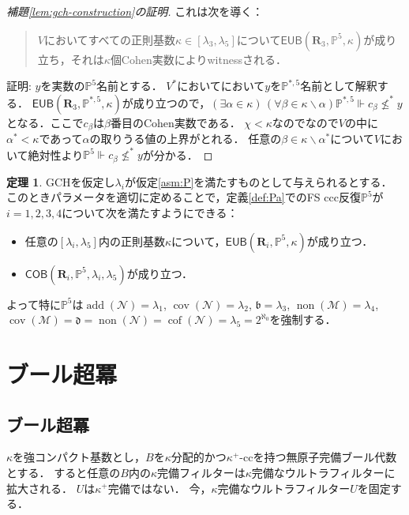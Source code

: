 \documentclass[uplatex,dvipdfmx]{jsarticle}
\newcommand\forces{\Vdash}
\newcommand{\non}{\operatorname{non}}
\newcommand{\cov}{\operatorname{cov}}
\newcommand{\add}{\operatorname{add}}
\newcommand{\cof}{\operatorname{cof}}
\newcommand{\EUB}{\mathsf{EUB}}
\newcommand{\COB}{\mathsf{COB}}
\newcommand{\relR}{\mathbf{R}}
\newcommand{\Pa}{\mathbb{P}^5}
\newcommand{\PaB}{\mathbb{P}^{*,5}}
\newcommand{\covnull}{\cov(\mathcal N)}
\newcommand{\cofnull}{\cof(\mathcal N)}
\newcommand{\addnull}{\add(\mathcal N)}
\newcommand{\nonnull}{\non(\mathcal N)}
\newcommand{\covmeager}{\cov(\mathcal M)}
\newcommand{\nonmeager}{\non(\mathcal M)}
\renewcommand\emptyset{\varnothing}
\renewcommand{\setminus}{\smallsetminus}
\theoremstyle{definition}
\newtheorem{thm}{定理}
\begin{document}
\begin{proof}[補題\ref{lem:gch-construction}の証明]
		これは次を導く：
		\begin{quote}
			$V$においてすべての正則基数$\kappa\in[\lambda_3,\lambda_5]$について$\EUB(\relR_3, \Pa,\kappa)$が成り立ち，それは$\kappa$個Cohen実数によりwitnessされる．
		\end{quote}
	
		証明:
		$y$を実数の$\Pa$名前とする．
		$V^*$においてにおいて$y$を$\PaB$名前として解釈する．
		$\EUB(\relR_3, \PaB,\kappa)$が成り立つので，$(\exists \alpha\in\kappa)\, (\forall \beta\in\kappa\setminus \alpha)
		\PaB\forces  c_\beta \nleq^* y$となる．ここで$c_\beta$は$\beta$番目のCohen実数である．
		$\chi<\kappa$なのでなので$V$の中に$\alpha^*<\kappa$であって$\alpha$の取りうる値の上界がとれる．
		任意の$\beta\in\kappa\setminus \alpha^*$について$V$において絶対性より$\Pa\forces  c_\beta \nleq^* y$が分かる．
	\end{proof}
		
	
	\begin{thm}\label{thm:Pa}
		GCHを仮定し$\lambda_i$が仮定\ref{asm:P}を満たすものとして与えられるとする．
		このときパラメータを適切に定めることで，定義\ref{def:Pa}でのFS ccc反復$\Pa$が$i=1,2,3,4$について次を満たすようにできる：
		\begin{itemize} 
			\item  任意の$[\lambda_i,\lambda_5]$内の正則基数$\kappa$について，$\EUB(\relR_i, \Pa,\kappa)$が成り立つ．
			\item $\COB(\relR_i, \Pa,\lambda_i,\lambda_5)$が成り立つ．
		\end{itemize}
		よって特に$\Pa$は$\addnull=\lambda_1$, $\covnull=\lambda_2$, 
		$\mathfrak{b}=\lambda_3$, $\nonmeager=\lambda_4$,
		$\covmeager=\mathfrak{d}=\nonnull=\cofnull=\lambda_5=2^{\aleph_0}$を強制する．
	\end{thm}
	
	\section{ブール超冪}
	
	\subsection{ブール超冪}
	
	$\kappa$を強コンパクト基数とし，$B$を$\kappa$分配的かつ$\kappa^+$-ccを持つ無原子完備ブール代数とする．
	すると任意の$B$内の$\kappa$完備フィルターは$\kappa$完備なウルトラフィルターに拡大される．
	$U$は$\kappa^+$完備ではない．
	今，$\kappa$完備なウルトラフィルター$U$を固定する．
	
\end{document}
